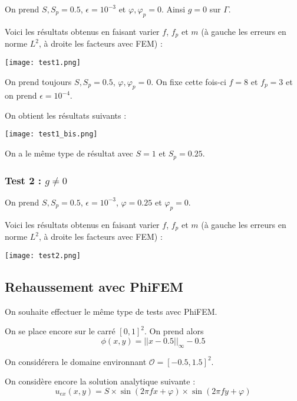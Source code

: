On prend $S,S_p=0.5$, $\epsilon=10^{-3}$ et $\varphi,\varphi_p=0$. Ainsi $g=0$ sur $\Gamma$. 

Voici les résultats obtenus en faisant varier $f$, $f_p$ et $m$ (à gauche les erreurs en norme $L^2$, à droite les facteurs avec FEM) :

\begin{minipage}{\linewidth}
	\centering
	\texttt{[image: test1.png]}
\end{minipage}

On prend toujours $S,S_p=0.5$, $\varphi,\varphi_p=0$. On fixe cette fois-ci $f=8$ et $f_p=3$ et on prend $\epsilon=10^{-4}$. 

On obtient les résultats suivants :

\begin{minipage}{\linewidth}
	\centering
	\texttt{[image: test1\_bis.png]}
\end{minipage}

\begin{Rem}
	On a le même type de résultat avec $S=1$ et $S_p=0.25$.
\end{Rem}

\subsubsection*{Test 2 : $g\ne 0$}

On prend $S,S_p=0.5$, $\epsilon=10^{-3}$, $\varphi=0.25$ et $\varphi_p=0$.

Voici les résultats obtenus en faisant varier $f$, $f_p$ et $m$ (à gauche les erreurs en norme $L^2$, à droite les facteurs avec FEM) :


\begin{minipage}{\linewidth}
	\centering
	\texttt{[image: test2.png]}
\end{minipage}

\subsection{Rehaussement avec PhiFEM}

On souhaite effectuer le même type de tests avec PhiFEM.

On se place encore sur le carré $[0,1]^2$. On prend alors
$$\phi (x,y)=||x-0.5||_\infty-0.5$$

On considérera le domaine environnant $\mathcal{O}=[-0.5,1.5]^2$.

On considère encore la solution analytique suivante :
$$u_{ex}(x,y) = S\times\sin(2\pi fx + \varphi)\times\sin(2\pi fy + \varphi)$$ 


